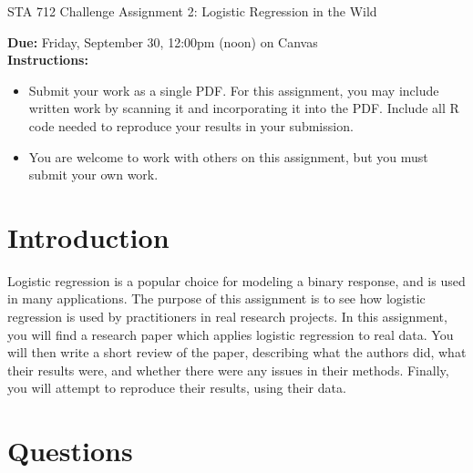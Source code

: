 \documentclass[11pt]{article}
\begin{document}
\begin{center}
\Large
STA 712 Challenge Assignment 2: Logistic Regression in the Wild\\
\normalsize
\vspace{5mm}
\end{center}

\noindent \textbf{Due:} Friday, September 30, 12:00pm (noon) on Canvas\\ 

\noindent \textbf{Instructions:} 
\begin{itemize}
\item Submit your work as a single PDF. For this assignment, you may include written work by scanning it and incorporating it into the PDF. Include all R code needed to reproduce your results in your submission.
\item You are welcome to work with others on this assignment, but you must submit your own work.
\end{itemize}

\section*{Introduction}

Logistic regression is a popular choice for modeling a binary response, and is used in many applications. The purpose of this assignment is to see how logistic regression is used by practitioners in real research projects. In this assignment, you will find a research paper which applies logistic regression to real data. You will then write a short review of the paper, describing what the authors did, what their results were, and whether there were any issues in their methods. Finally, you will attempt to reproduce their results, using their data.

\section*{Questions}
\end{document}
